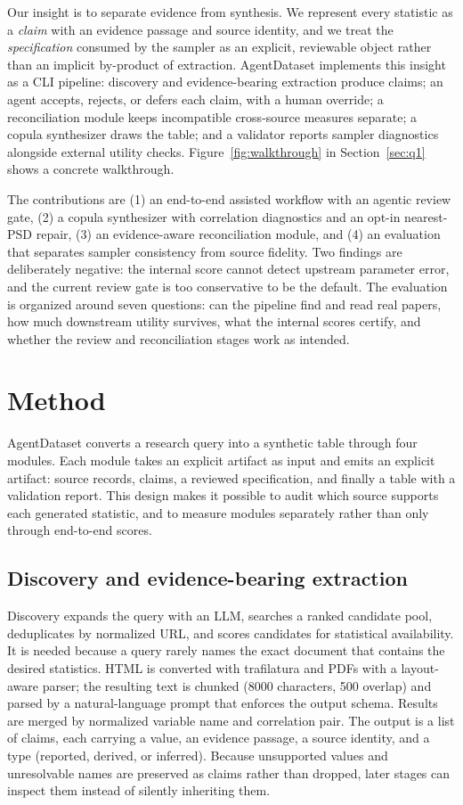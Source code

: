 \documentclass[letterpaper]{article}
\begin{document}
Our insight is to separate evidence from synthesis. We represent every statistic as a
\textit{claim} with an evidence passage and source identity, and we treat the \textit{specification}
consumed by the sampler as an explicit, reviewable object rather than an implicit by-product of
extraction. AgentDataset implements this insight as a CLI pipeline: discovery and evidence-bearing
extraction produce claims; an agent accepts, rejects, or defers each claim, with a human override;
a reconciliation module keeps incompatible cross-source measures separate; a copula synthesizer
draws the table; and a validator reports sampler diagnostics alongside external utility checks.
Figure~\ref{fig:walkthrough} in Section~\ref{sec:q1} shows a concrete walkthrough.

The contributions are (1) an end-to-end assisted workflow with an agentic review gate, (2) a copula
synthesizer with correlation diagnostics and an opt-in nearest-PSD repair, (3) an evidence-aware
reconciliation module, and (4) an evaluation that separates sampler consistency from source
fidelity. Two findings are deliberately negative: the internal score cannot detect upstream
parameter error, and the current review gate is too conservative to be the default. The evaluation
is organized around seven questions: can the pipeline find and read real papers, how much
downstream utility survives, what the internal scores certify, and whether the review and
reconciliation stages work as intended.

\section{Method}
\label{sec:method}

AgentDataset converts a research query into a synthetic table through four modules. Each module
takes an explicit artifact as input and emits an explicit artifact: source records, claims, a
reviewed specification, and finally a table with a validation report. This design makes it
possible to audit which source supports each generated statistic, and to measure modules
separately rather than only through end-to-end scores.

\subsection{Discovery and evidence-bearing extraction}
\label{sec:extract}

Discovery expands the query with an LLM, searches a ranked candidate pool, deduplicates by
normalized URL, and scores candidates for statistical availability. It is needed because a query
rarely names the exact document that contains the desired statistics. HTML is converted with
trafilatura and PDFs with a layout-aware parser; the resulting text is chunked (8000 characters,
500 overlap) and parsed by a natural-language prompt that enforces the output schema. Results are
merged by normalized variable name and correlation pair. The output is a list of claims, each
carrying a value, an evidence passage, a source identity, and a type (reported, derived, or
inferred). Because unsupported values and unresolvable names are preserved as claims rather than
dropped, later stages can inspect them instead of silently inheriting them.
\end{document}
